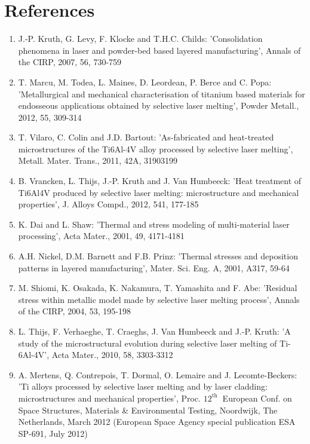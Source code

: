 \documentclass[10pt]{article}
\begin{document}
\section*{References}
\begin{enumerate}
  \item J.-P. Kruth, G. Levy, F. Klocke and T.H.C. Childs: 'Consolidation phenomena in laser and powder-bed based layered manufacturing', Annals of the CIRP, 2007, 56, 730-759

  \item T. Marcu, M. Todea, L. Maines, D. Leordean, P. Berce and C. Popa: 'Metallurgical and mechanical characterisation of titanium based materials for endosseous applications obtained by selective laser melting', Powder Metall., 2012, 55, 309-314

  \item T. Vilaro, C. Colin and J.D. Bartout: 'As-fabricated and heat-treated microstructures of the Ti6Al-4V alloy processed by selective laser melting', Metall. Mater. Trans., 2011, 42A, 31903199

  \item B. Vrancken, L. Thijs, J.-P. Kruth and J. Van Humbeeck: 'Heat treatment of Ti6Al4V produced by selective laser melting: microstructure and mechanical properties', J. Alloys Compd., 2012, 541, 177-185

  \item K. Dai and L. Shaw: 'Thermal and stress modeling of multi-material laser processing', Acta Mater., 2001, 49, 4171-4181

  \item A.H. Nickel, D.M. Barnett and F.B. Prinz: 'Thermal stresses and deposition patterns in layered manufacturing', Mater. Sci. Eng. A, 2001, A317, 59-64

  \item M. Shiomi, K. Osakada, K. Nakamura, T. Yamashita and F. Abe: 'Residual stress within metallic model made by selective laser melting process', Annals of the CIRP, 2004, 53, 195-198

  \item L. Thijs, F. Verhaeghe, T. Craeghs, J. Van Humbeeck and J.-P. Kruth: 'A study of the microstructural evolution during selective laser melting of Ti-6Al-4V', Acta Mater., 2010, 58, 3303-3312

  \item A. Mertens, Q. Contrepois, T. Dormal, O. Lemaire and J. Lecomte-Beckers: 'Ti alloys processed by selective laser melting and by laser cladding: microstructures and mechanical properties', Proc. $12^{\text {th }}$ European Conf. on Space Structures, Materials \& Environmental Testing, Noordwijk, The Netherlands, March 2012 (European Space Agency special publication ESA SP-691, July 2012)


\end{enumerate}
\end{document}

